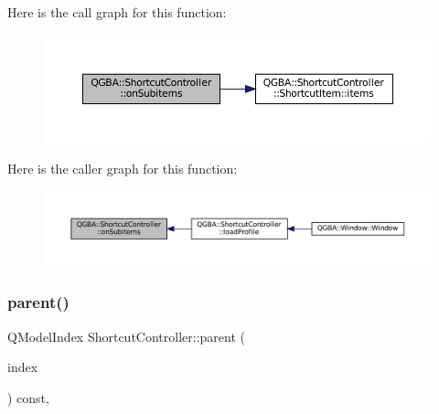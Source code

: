 Here is the call graph for this function\+:
\nopagebreak
\begin{figure}[H]
\begin{center}
\leavevmode
\includegraphics[width=350pt]{class_q_g_b_a_1_1_shortcut_controller_a25d9133d4546e69a56135f162badb4c0_cgraph}
\end{center}
\end{figure}
Here is the caller graph for this function\+:
\nopagebreak
\begin{figure}[H]
\begin{center}
\leavevmode
\includegraphics[width=350pt]{class_q_g_b_a_1_1_shortcut_controller_a25d9133d4546e69a56135f162badb4c0_icgraph}
\end{center}
\end{figure}
\mbox{\label{class_q_g_b_a_1_1_shortcut_controller_a03dfea8451c656378e1fb81faf4843ca}} 
\subsubsection{\texorpdfstring{parent()}{parent()}}
{\footnotesize\ttfamily Q\+Model\+Index Shortcut\+Controller\+::parent (\begin{DoxyParamCaption}\item[{const Q\+Model\+Index \&}]{index }\end{DoxyParamCaption}) const\hspace{0.3cm}{\ttfamily [override]}, {\ttfamily [virtual]}}

